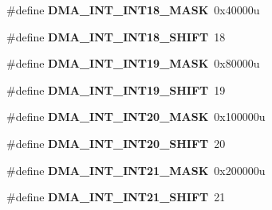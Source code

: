 \begin{DoxyCompactItemize}
\item 
\hypertarget{group___d_m_a___register___masks_ga4b998ed9b30d86fdd09cadbae03947df}{}\#define {\bfseries D\+M\+A\+\_\+\+I\+N\+T\+\_\+\+I\+N\+T18\+\_\+\+M\+A\+S\+K}~0x40000u\label{group___d_m_a___register___masks_ga4b998ed9b30d86fdd09cadbae03947df}

\item 
\hypertarget{group___d_m_a___register___masks_ga047a8c3d1f67ccb713d839dd157cc11c}{}\#define {\bfseries D\+M\+A\+\_\+\+I\+N\+T\+\_\+\+I\+N\+T18\+\_\+\+S\+H\+I\+F\+T}~18\label{group___d_m_a___register___masks_ga047a8c3d1f67ccb713d839dd157cc11c}

\item 
\hypertarget{group___d_m_a___register___masks_ga0107beedac96236756e65a65b1ba6ada}{}\#define {\bfseries D\+M\+A\+\_\+\+I\+N\+T\+\_\+\+I\+N\+T19\+\_\+\+M\+A\+S\+K}~0x80000u\label{group___d_m_a___register___masks_ga0107beedac96236756e65a65b1ba6ada}

\item 
\hypertarget{group___d_m_a___register___masks_ga9a26de5c68a5d5428ea3f06b3f30449a}{}\#define {\bfseries D\+M\+A\+\_\+\+I\+N\+T\+\_\+\+I\+N\+T19\+\_\+\+S\+H\+I\+F\+T}~19\label{group___d_m_a___register___masks_ga9a26de5c68a5d5428ea3f06b3f30449a}

\item 
\hypertarget{group___d_m_a___register___masks_gaaf1038791b70d74ae3fa1df8bc407504}{}\#define {\bfseries D\+M\+A\+\_\+\+I\+N\+T\+\_\+\+I\+N\+T20\+\_\+\+M\+A\+S\+K}~0x100000u\label{group___d_m_a___register___masks_gaaf1038791b70d74ae3fa1df8bc407504}

\item 
\hypertarget{group___d_m_a___register___masks_gae6058cd74b5ef9f3b9a37a6179eebcb9}{}\#define {\bfseries D\+M\+A\+\_\+\+I\+N\+T\+\_\+\+I\+N\+T20\+\_\+\+S\+H\+I\+F\+T}~20\label{group___d_m_a___register___masks_gae6058cd74b5ef9f3b9a37a6179eebcb9}

\item 
\hypertarget{group___d_m_a___register___masks_ga6cef5448b9a0f17e3f69430efcedda6c}{}\#define {\bfseries D\+M\+A\+\_\+\+I\+N\+T\+\_\+\+I\+N\+T21\+\_\+\+M\+A\+S\+K}~0x200000u\label{group___d_m_a___register___masks_ga6cef5448b9a0f17e3f69430efcedda6c}

\item 
\hypertarget{group___d_m_a___register___masks_ga9608b5035282e419811e433dafebccf2}{}\#define {\bfseries D\+M\+A\+\_\+\+I\+N\+T\+\_\+\+I\+N\+T21\+\_\+\+S\+H\+I\+F\+T}~21\label{group___d_m_a___register___masks_ga9608b5035282e419811e433dafebccf2}


\end{DoxyCompactItemize}

